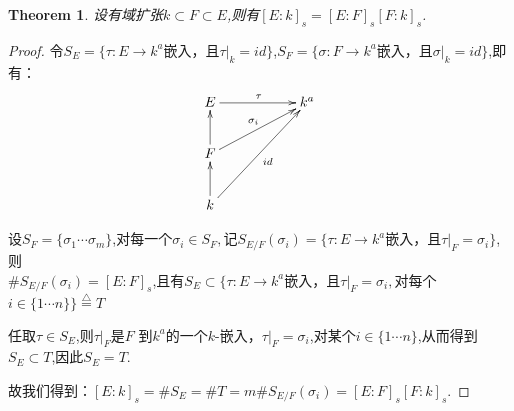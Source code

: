 \documentclass[UTF8]{article}
\newtheorem{thm}{Theorem}[section]
\begin{document}
\begin{thm}
 设有域扩张$k\subset F\subset E$,则有$[E:k]_s=[E:F]_s[F:k]_s$.
\end{thm}
\begin{proof}
令$S_{E}=\{\tau:E\rightarrow k^a$嵌入，且$\tau|_k=id\}$,$S_{F}=\{\sigma:F\rightarrow k^a$嵌入，且$\sigma|_k=id\}$,即有：$$\xymatrix{E\ar[rr]^{\tau}&&{k^a}\\F \ar[u] \ar[rru]^{\sigma_i} && \\k \ar[u] \ar[rruu]_{id} && } $$

设$S_{F}=\{\sigma_1\cdots \sigma_m\}$,对每一个$\sigma_i\in S_F,$记$S_{E/F}(\sigma_i)=\{\tau:E\rightarrow k^a$嵌入，且$\tau|_F=\sigma_i\}$,则\\%
$\# S_{E/F}(\sigma_i)=[E:F]_s$,且有$S_E\subset \{\tau:E\rightarrow k^a$嵌入，且$\tau|_F=\sigma_i,$对每个$i\in \{1\cdots n\}\} \stackrel{\bigtriangleup}{=}T$

任取$\tau\in S_E$,则$\tau|_F$是$F$ 到$k^a$的一个$k$-嵌入，$\tau|_F=\sigma_i$,对某个$i\in \{1\cdots n\}$,从而得到$S_E\subset T$,因此$S_E=T$.

故我们得到：$[E:k]_s=\#S_E=\#T=m\#S_{E/F}(\sigma_i)=[E:F]_s[F:k]_s.$
\end{proof}
\end{document}
